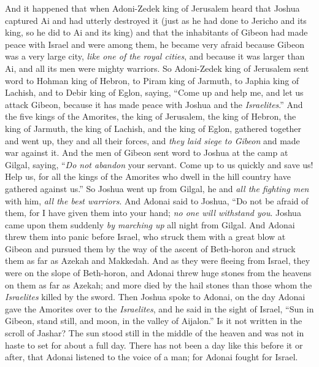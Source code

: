 \begin{biblechapter} %
 And it happened that when Adoni-Zedek king of Jerusalem heard that Joshua captured Ai and had utterly destroyed it (just as he had done to Jericho and its king, so he did to Ai and its king) and that the inhabitants of Gibeon had made peace with Israel and were among them,
\verse he became very afraid because Gibeon was a very large city, \textit{like one of the royal cities}, and because it was larger than Ai, and all its men were mighty warriors.
\verse So Adoni-Zedek king of Jerusalem sent word to Hohman king of Hebron, to Piram king of Jarmuth, to Japhia king of Lachish, and to Debir king of Eglon, saying,
\verse “Come up and help me, and let us attack Gibeon, because it has made peace with Joshua and the \textit{Israelites}.”
\verse And the five kings of the Amorites, the king of Jerusalem, the king of Hebron, the king of Jarmuth, the king of Lachish, and the king of Eglon, gathered together and went up, they and all their forces, and \textit{they laid siege to Gibeon} and made war against it.
\verse And the men of Gibeon sent word to Joshua at the camp at Gilgal, saying, “\textit{Do not abandon} your servant. Come up to us quickly and save us! Help us, for all the kings of the Amorites who dwell in the hill country have gathered against us.”
\verse So Joshua went up from Gilgal, he and \textit{all the fighting men} with him, \textit{all the best warriors}.
\verse And Adonai said to Joshua, “Do not be afraid of them, for I have given them into your hand; \textit{no one will withstand you}.
\verse Joshua came upon them suddenly \textit{by marching up} all night from Gilgal.
\verse And Adonai threw them into panic before Israel, who struck them with a great blow at Gibeon and pursued them by the way of the ascent of Beth-horon and struck them as far as Azekah and Makkedah.
\verse And as they were fleeing from Israel, they were on the slope of Beth-horon, and Adonai threw huge stones from the heavens on them as far as Azekah; and more died by the hail stones than those whom the \textit{Israelites} killed by the sword.
\verse Then Joshua spoke to Adonai, on the day Adonai gave the Amorites over to the \textit{Israelites}, and he said in the sight of Israel,
\verse “Sun in Gibeon, stand still, 
and moon, in the valley of Aijalon.”
\verse Is it not written in the scroll of Jashar? The sun stood still in the middle of the heaven and was not in haste to set for about a full day.
\verse There has not been a day like this before it or after, that Adonai listened to the voice of a man; for Adonai fought for Israel.

\end{biblechapter}
